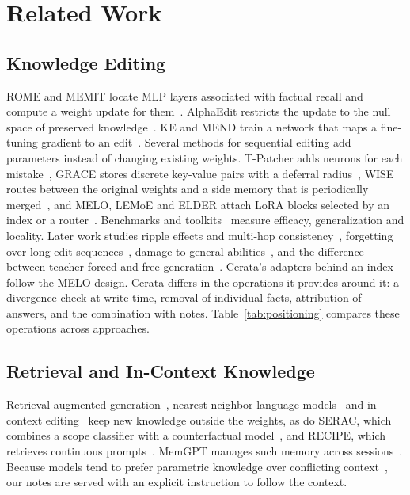 \documentclass[journal,10pt]{IEEEtran}
\begin{document}
\section{Related Work}
\label{sec:related}

\subsection{Knowledge Editing}
ROME and MEMIT locate MLP layers associated with factual recall and compute a weight
update for them~\cite{meng2022rome,meng2023memit}. AlphaEdit restricts the update to the
null space of preserved knowledge~\cite{fang2025alphaedit}. KE and MEND train a network
that maps a fine-tuning gradient to an edit~\cite{decao2021editing,mitchell2022mend}.
Several methods for sequential editing add parameters instead of changing existing
weights. T-Patcher adds neurons for each mistake~\cite{huang2023tpatcher}, GRACE stores
discrete key-value pairs with a deferral radius~\cite{hartvigsen2023grace}, WISE routes
between the original weights and a side memory that is periodically
merged~\cite{wang2024wise}, and MELO, LEMoE and ELDER attach LoRA blocks selected by an
index or a router~\cite{yu2024melo,wang2024lemoe,li2025elder}. Benchmarks and
toolkits~\cite{yao2023editing,wang2024easyedit} measure efficacy, generalization and
locality. Later work studies ripple effects and multi-hop
consistency~\cite{cohen2024ripple,zhong2023mquake}, forgetting over long edit
sequences~\cite{gupta2024forgetting}, damage to general abilities~\cite{gu2024harms},
and the difference between teacher-forced and free generation~\cite{yang2025mirage}.
Cerata's adapters behind an index follow the MELO design. Cerata differs in the
operations it provides around it: a divergence check at write time, removal of
individual facts, attribution of answers, and the combination with notes.
Table~\ref{tab:positioning} compares these operations across approaches.



\subsection{Retrieval and In-Context Knowledge}
Retrieval-augmented generation~\cite{lewis2020rag}, nearest-neighbor language
models~\cite{khandelwal2020knnlm} and in-context editing~\cite{zheng2023ike} keep new
knowledge outside the weights, as do SERAC, which combines a scope classifier with a
counterfactual model~\cite{mitchell2022serac}, and RECIPE, which retrieves continuous
prompts~\cite{chen2024recipe}. MemGPT manages such memory across
sessions~\cite{packer2023memgpt}. Because models tend to prefer parametric knowledge
over conflicting context~\cite{longpre2021conflicts,xie2024chameleon}, our notes are
served with an explicit instruction to follow the context.
\end{document}
